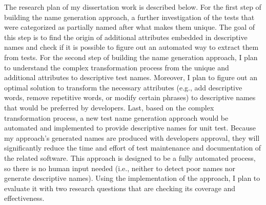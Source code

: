 The research plan of my dissertation work is described below.
%
For the first step of building the name generation approach, a further investigation of the tests that were categorized as partially named after what makes them unique.
%
The goal of this step is to find the origin of additional attributes embedded in descriptive names and check if it is possible to figure out an automated way to extract them from tests.
%
For the second step of building the name generation approach, I plan to understand the complex transformation process from the unique and additional attributes to descriptive test names.
%
Moreover, I plan to figure out an optimal solution to transform the necessary attributes (e.g., add descriptive words, remove repetitive words, or modify certain phrases) to descriptive names that would be preferred by developers.
%
Last, based on the complex transformation process, a new test name generation approach would be automated and implemented to provide descriptive names for unit test.
%
Because my approach's generated names are produced with developers approval, they will significantly reduce the time and effort of test maintenance and documentation of the related software.
%
This approach is designed to be a fully automated process, so there is no human input needed (i.e., neither to detect poor names nor generate descriptive names).
%
Using the implementation of the approach, I plan to evaluate it with two research questions that are checking its coverage and effectiveness.


